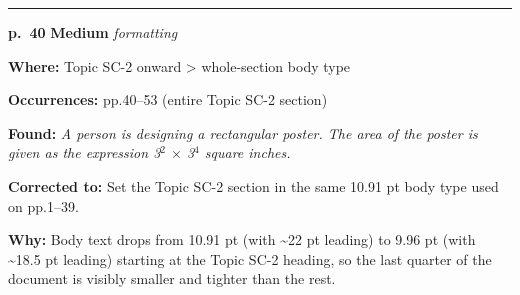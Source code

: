 \documentclass[11pt]{article}
\newcommand{\sevmed}[1]{\textcolor{orange!80!black}{\textbf{#1}}}
\begin{document}
\noindent\rule{\textwidth}{0.4pt}\par\nobreak\vspace{2pt}
\noindent\textbf{p.~40} \quad \sevmed{Medium} \quad \textit{formatting}\par
\noindent\textbf{Where: }Topic SC-2 onward > whole-section body type\par
\noindent\textbf{Occurrences: }pp.40--53 (entire Topic SC-2 section)\par
\noindent\textbf{Found: }\textit{A person is designing a rectangular poster. The area of the poster is given as the expression 3$^2$ $\times$ 3$^4$ square inches.}\par
\noindent\textbf{Corrected to: }Set the Topic SC-2 section in the same 10.91 pt body type used on pp.1--39.\par
\noindent\textbf{Why: }Body text drops from 10.91 pt (with \textasciitilde{}22 pt leading) to 9.96 pt (with \textasciitilde{}18.5 pt leading) starting at the Topic SC-2 heading, so the last quarter of the document is visibly smaller and tighter than the rest.\par\vspace{4pt}
\end{document}
